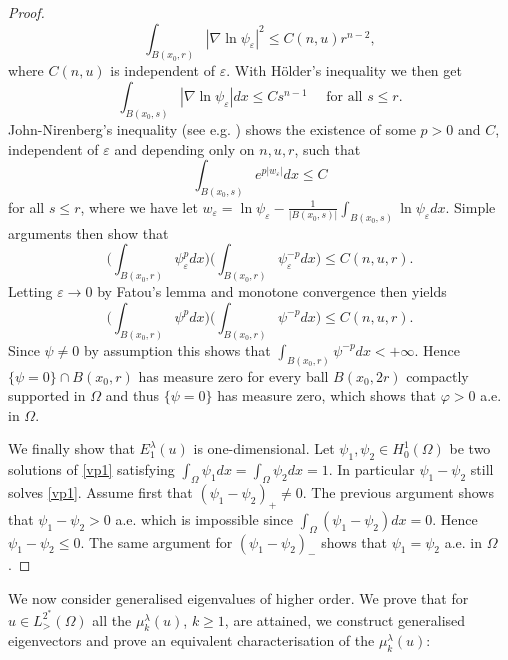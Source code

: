 \documentclass[10pt]{amsart}
\numberwithin{equation}{section}
\newcommand{\ve}{\varepsilon}
\newcommand{\vp}{\varphi}
\newcommand{\Om}{\Omega}
\newcommand{\mkl}{\mu_{k}^{\lambda}}
\theoremstyle{plain}
\theoremstyle{remark}
\begin{document}
\begin{proof}
\begin{equation*}
\int_{B(x_0,r)} |\nabla \ln \psi_\ve|^2 \le  C(n,u) r^{n-2},
\end{equation*}
where $C(n,u)$ is independent of $\ve$. With H\"older's inequality we then get 
$$\int_{B(x_0,s)} |\nabla \ln \psi_\ve|dx \le C s^{n-1} \quad \text{ for all } s \le r. $$
John-Nirenberg's inequality (see e.g. \cite[Theorem $7.21$]{GilTru}) shows the existence of some $p>0$ and $C$, independent of $\ve$ and depending only on $n,u,r$, such that 
$$ \int_{B(x_0,s)} e^{p|w_\ve|} dx \le C $$
for all $s \le r$, where we have let $w_\ve = \ln \psi_\ve - \frac{1}{|B(x_0,s)|} \int_{B(x_0,s)} \ln \psi_\ve dx$. Simple arguments then show that 
$$\Big( \int_{B(x_0,r)} \psi_\ve^p dx \Big) \Big(\int_{B(x_0,r)} \psi_\ve^{-p} dx\Big) \le C(n,u,r). $$
Letting $\ve \to 0$ by Fatou's lemma and monotone convergence then yields 
$$\Big( \int_{B(x_0,r)} \psi^p dx \Big) \Big(\int_{B(x_0,r)} \psi^{-p} dx\Big) \le C(n,u,r). $$
Since $\psi \neq 0$ by assumption this shows that $\int_{B(x_0,r)} \psi^{-p} dx < + \infty$. Hence $\{\psi = 0\} \cap B(x_0,r)$ has measure zero for every ball $B(x_0, 2r)$ compactly supported in $\Om$ and thus $\{\psi = 0\}$ has measure zero, which shows that $\vp >0$ a.e. in $\Omega$. 

We finally show that $E_1^{\lambda}(u)$ is one-dimensional. Let $\psi_1,\psi_2 \in H^1_0(\Om)$ be two solutions of \eqref{vp1} satisfying $\int_\Om \psi_1dx = \int_{\Om} \psi_2 dx = 1$. In particular $\psi_1 - \psi_2$ still solves \eqref{vp1}. Assume first that $(\psi_1 - \psi_2)_+ \neq 0$. The previous argument shows that $\psi_1 - \psi_2 >0$ a.e. which is impossible since $\int_{\Om} (\psi_1 - \psi_2)dx = 0$. Hence $\psi_1 - \psi_2 \le 0$. The same argument for $(\psi_1-\psi_2)_{-}$ shows that $\psi_1 = \psi_2$ a.e. in $\Om$. 
\end{proof}

We now consider generalised eigenvalues of higher order. We prove that for $u \in L^{2^*}_{>}(\Om)$ all the $\mkl(u)$, $k \ge 1$, are attained, we construct generalised eigenvectors and prove an equivalent characterisation of the $\mkl(u)$: 
\end{document}

